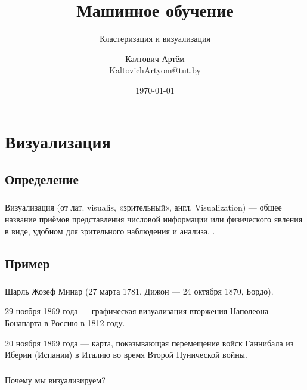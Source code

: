 \documentclass[t,aspectratio=169]{beamer}  %
\title{Машинное обучение}
\subtitle{Кластеризация и визуализация}
\author{Калтович Артём\\KaltovichArtyom@tut.by}
\date{\today}
\begin{document}
\frame[plain]{\titlepage}	%

\section{Визуализация}
\subsection{Определение}

\begin{frame}
    \frametitle{\insertsection} 
    \framesubtitle{\insertsubsection}
    Визуализация (от лат. visualis, «зрительный», англ. Visualization) — общее название приёмов представления числовой информации или физического явления в виде, удобном для зрительного наблюдения и анализа. \cite{wiki:visualization_def}.
\end{frame}

\subsection{Пример}

\begin{frame}[plain,c]
    \frametitle{\insertsection} 
    \framesubtitle{\insertsubsection}
\end{frame}

\begin{frame}
    \frametitle{\insertsection} 
    \framesubtitle{\insertsubsection}
    Шарль Жозеф Минар (27 марта 1781, Дижон — 24 октября 1870, Бордо).\vspace{1cm}
    
    29 ноября 1869 года — графическая визуализация вторжения Наполеона Бонапарта в Россию в 1812 году.\vspace{1cm}
    
    20 ноября 1869 года — карта, показывающая перемещение войск Ганнибала из Иберии (Испании) в Италию во время Второй Пунической войны. 
\end{frame}

\begin{frame}[plain,c]
    \frametitle{\insertsection} 
    \framesubtitle{\insertsubsection}
\end{frame}

\begin{frame}[plain,c]
    \frametitle{\insertsection} 
    \framesubtitle{\insertsubsection}
    \begin{center}
        \huge Почему мы визуализируем?
    \end{center}
\end{frame}
\end{document}

